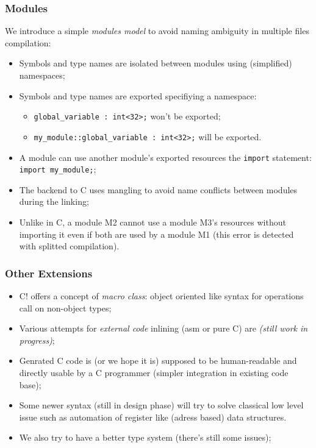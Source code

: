 \documentclass[pdftex]{beamer}
\begin{document}
\begin{frame}[fragile]
  \frametitle{Modules}
  We introduce a simple \emph{modules model} to avoid naming ambiguity
  in multiple files compilation:
  \begin{itemize}
  \item Symbols and type names are isolated between modules using
    (simplified) namespaces;
  \item Symbols and type names are exported specifiying a namespace:
    \begin{itemize}
    \item \verb#global_variable : int<32>;# won't be exported;
    \item \verb#my_module::global_variable : int<32>;# will be exported.
    \end{itemize}
  \item A module can use another module's exported resources the
    \texttt{import} statement: \verb#import my_module;#;
  \item The backend to C uses mangling to avoid name conflicts between modules
    during the linking;
  \item Unlike in C, a module M2 cannot use a module M3's resources without
    importing it even if both are used by a module M1 (this error is detected
    with splitted compilation).
  \end{itemize}
\end{frame}

\begin{frame}
  \frametitle{Other Extensions}
  \begin{itemize}
  \item C! offers a concept of \emph{macro class}: object oriented
    like syntax for operations call on non-object types;
  \item Various attempts for \emph{external code} inlining (asm or
    pure C) are \emph{(still work in progress)};
  \item Genrated C code is (or we hope it is) supposed to be human-readable and
    directly usable by a C programmer (simpler integration in existing code
    base);
  \item Some newer syntax (still in design phase) will try to solve
    classical low level issue such as automation of register like
    (adress based) data structures.
  \item We also try to have a better type system (there's still some
    issues);
  \end{itemize}
\end{frame}
\end{document}
